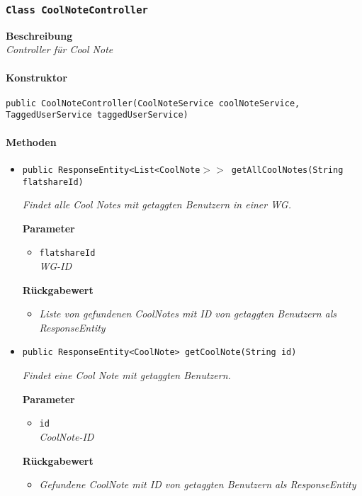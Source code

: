      \subsubsection{\texttt{Class CoolNoteController}}
     \textbf{Beschreibung} \\
     \textit{Controller für Cool Note}
     \paragraph*{Konstruktor}\mbox{}
     \texttt{public CoolNoteController(CoolNoteService coolNoteService, TaggedUserService taggedUserService)}
     \paragraph*{Methoden}
     \begin{itemize}
     	\item{\texttt{public ResponseEntity<List<CoolNote$>>$ getAllCoolNotes(String flatshareId)}}
     	
     	\textit{Findet alle Cool Notes mit getaggten Benutzern in einer WG.}
     	
     	\textbf{Parameter}
     	\begin{itemize}
     		\item\texttt{flatshareId}\\
     		\textit{WG-ID}
     	\end{itemize}
     	
     	\textbf{Rückgabewert}
     	\begin{itemize}
     		\item\textit{Liste von gefundenen CoolNotes mit ID von getaggten Benutzern als ResponseEntity}
     	\end{itemize}
     
     \item{\texttt{public ResponseEntity<CoolNote> getCoolNote(String id)}}
     	
     	\textit{Findet eine Cool Note mit getaggten Benutzern.}
     	
     	\textbf{Parameter}
     	\begin{itemize}
     		\item\texttt{id}\\
     		\textit{CoolNote-ID}
     	\end{itemize}
     	
     	\textbf{Rückgabewert}
     	\begin{itemize}
     		\item\textit{Gefundene CoolNote mit ID von getaggten Benutzern als ResponseEntity} 
     	\end{itemize}
     	        

\end{itemize}
